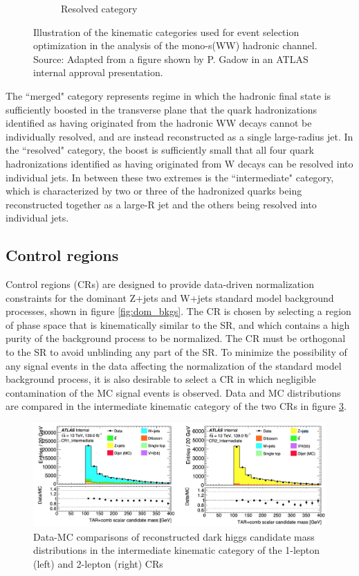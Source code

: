 \documentclass[12pt]{article}
\begin{document}
\begin{figure}[H]
\begin{subfigure}[b]{0.29\textwidth}
         \caption[]{Resolved category}
         \label{fig:had_resolved}
     \end{subfigure}
\caption[]{Illustration of the kinematic categories used for event selection optimization in the analysis of the mono-s(WW) hadronic channel. Source: Adapted from a figure shown by P. Gadow in an ATLAS internal approval presentation. }
\label{fig:had_categories}
\end{figure}

The ``merged" category represents regime in which the hadronic final state is sufficiently boosted in the transverse plane that the quark hadronizations identified as having originated from the hadronic WW decays cannot be individually resolved, and are instead reconstructed as a single large-radius jet. In the ``resolved" category, the boost is sufficiently small that all four quark hadronizations identified as having originated from W decays can be resolved into individual jets. In between these two extremes is the ``intermediate" category, which is characterized by two or three of the hadronized quarks being reconstructed together as a large-R jet and the others being resolved into individual jets.

\subsection{Control regions}

Control regions (CRs) are designed to provide data-driven normalization constraints for the dominant Z+jets and W+jets standard model background processes, shown in figure \ref{fig:dom_bkgs}. The CR is chosen by selecting a region of phase space that is kinematically similar to the SR, and which contains a high purity of the background process to be normalized. The CR must be orthogonal to the SR to avoid unblinding any part of the SR. To minimize the possibility of any signal events in the data affecting the normalization of the standard model background process, it is also desirable to select a CR in which negligible contamination of the MC signal events is observed. Data and MC distributions are compared in the intermediate kinematic category of the two CRs in figure \ref{fig:had_Intermediate_DataMC}. 

\begin{figure}[H]
	\centering
	\includegraphics[width=\textwidth]{figures/had_Intermediate_DataMC.png}
	\caption[]{Data-MC comparisons of reconstructed dark higgs candidate mass distributions in the intermediate kinematic category of the 1-lepton (left) and 2-lepton (right) CRs}
	\label{fig:had_Intermediate_DataMC} 
\end{figure}
\end{document}
